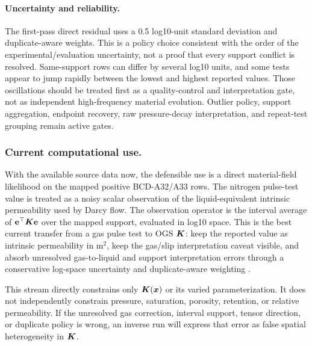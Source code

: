 \paragraph{Uncertainty and reliability.}
The first-pass direct residual uses a 0.5 log10-unit standard deviation and
duplicate-aware weights.  This is a policy choice consistent with the order of the
experimental/evaluation uncertainty, not a proof that every support conflict is
resolved.  Same-support rows can differ by several log10 units, and some tests
appear to jump rapidly between the lowest and highest reported values.  Those
oscillations should be treated first as a quality-control and interpretation gate,
not as independent high-frequency material evolution.  Outlier policy, support
aggregation, endpoint recovery, raw pressure-decay interpretation, and repeat-test
grouping remain active gates.

\subsubsection*{Current computational use.}
With the available source data now, the defensible use is a direct material-field
likelihood on the mapped positive BCD-A32/A33 rows.  The nitrogen pulse-test value
is treated as a noisy scalar observation of the liquid-equivalent intrinsic
permeability used by Darcy flow.  The observation operator is the interval average
of \(\mathbf e^\top\bm{K}\mathbf e\) over the mapped support, evaluated in log10 space.
This is the best current transfer from a gas pulse test to OGS \(\bm{K}\): keep the
reported value as intrinsic permeability in \(\mathrm{m^2}\), keep the gas/slip
interpretation caveat visible, and absorb unresolved gas-to-liquid and support
interpretation errors through a conservative log-space uncertainty and
duplicate-aware weighting
\citep[abstract]{Klinkenberg1941}
\citep[abstract and Secs.~2.2, 3.2]{Marschall2005}
\citep[source files used for the generated support and row summaries]{CDAProvidedMeasurementFiles2025}.

This stream directly constrains only \(\bm{K}(\bm{x})\) or its varied
parameterization.  It does not independently constrain pressure, saturation,
porosity, retention, or relative permeability.  If the unresolved gas correction,
interval support, tensor direction, or duplicate policy is wrong, an inverse run
will express that error as false spatial heterogeneity in \(\bm{K}\).

